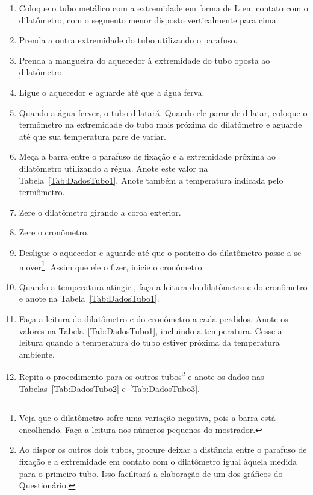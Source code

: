 \begin{enumerate}
\item Coloque o tubo metálico com a extremidade em forma de L em contato com o dilatômetro, com o segmento menor disposto verticalmente para cima.
\item Prenda a outra extremidade do tubo utilizando o parafuso.
\item Prenda a mangueira do aquecedor à extremidade do tubo oposta ao dilatômetro.
\item Ligue o aquecedor e aguarde  até que a água ferva.
\item Quando a água ferver, o tubo dilatará. Quando ele parar de dilatar, coloque o termômetro na extremidade do tubo mais próxima do dilatômetro e aguarde até que sua temperatura pare de variar.
\item Meça a barra entre o parafuso de fixação e a extremidade próxima ao dilatômetro utilizando a régua. Anote este valor na Tabela~\ref{Tab:DadosTubo1}. Anote também a temperatura indicada pelo termômetro.
\item Zere o dilatômetro girando a coroa exterior.
\item Zere o cronômetro.
\item Desligue o aquecedor e aguarde até que o ponteiro do dilatômetro passe a se mover\footnote{Veja que o dilatômetro sofre uma variação negativa, pois a barra está encolhendo. Faça a leitura nos números pequenos do mostrador.}. Assim que ele o fizer, inicie o cronômetro.
\item Quando a temperatura atingir , faça a leitura do dilatômetro e do cronômetro e anote na Tabela~\ref{Tab:DadosTubo1}.
\item Faça a leitura do dilatômetro e do cronômetro a cada  perdidos. Anote os valores na Tabela~\ref{Tab:DadosTubo1}, incluindo a temperatura. Cesse a leitura quando a temperatura do tubo estiver próxima da temperatura ambiente.
\item Repita o procedimento para os outros tubos\footnote{Ao dispor os outros dois tubos, procure deixar a distância entre o parafuso de fixação e a extremidade em contato com o dilatômetro igual àquela medida para o primeiro tubo. Isso facilitará a elaboração de um dos gráficos do Questionário.} e anote os dados nas Tabelas~\ref{Tab:DadosTubo2} e~\ref{Tab:DadosTubo3}.
\end{enumerate}

\cleardoublepage

